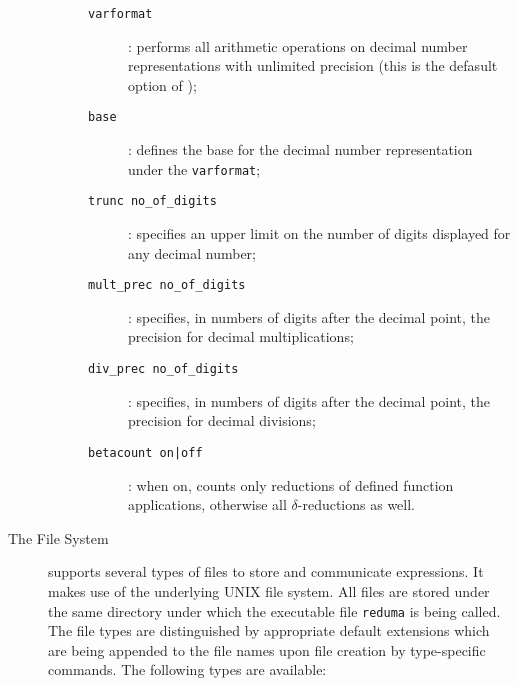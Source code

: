 \begin{description}
\begin{description}
\begin{description}
\item[{\tt varformat}]: performs all arithmetic operations on decimal
number representations with unlimited precision (this is the defasult
option of \pired);
\item[{\tt base}]: defines the base for the decimal number representation under the {\tt varformat};
\item[{\tt trunc no\_of\_digits}]: specifies an upper limit on the number of digits displayed for any decimal number;
\item[{\tt mult\_prec no\_of\_digits}]: specifies, in numbers of digits
after the decimal point, the precision for decimal multiplications;
\item[{\tt div\_prec no\_of\_digits}]: specifies, in numbers of digits
after the decimal point, the precision for decimal divisions;
\item[{\tt betacount on|off}]: when on, counts only reductions of defined function applications, otherwise all $\delta$-reductions as well.

\end{description}
\end{description}

\item[The File System] $\;$\\
\pired supports several types of files to store and communicate 
\kir expressions. It makes use of the underlying UNIX file system.
All files are stored under the same directory under which the
executable file {\tt reduma} is being called.
The file types are distinguished by appropriate default extensions
which are being appended to the file names upon file creation by
type-specific commands. The following types are available:


\end{description}
